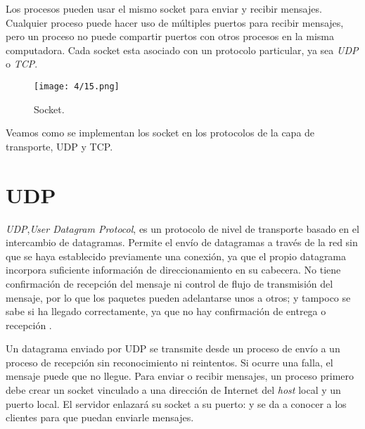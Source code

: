 Los \gls{procesos} pueden usar el mismo socket para enviar y recibir mensajes.   
Cualquier proceso puede hacer uso de múltiples puertos para recibir mensajes, pero un proceso no puede compartir puertos con otros procesos en la misma computadora. 
Cada socket esta asociado con un protocolo particular, ya sea \textit{UDP} o \textit{TCP}.


\begin{figure}  
	 \begin{center}%
	\texttt{[image: 4/15.png]}
	\caption{Socket.}
	\label{fig:socket}
\end{center} 
 \end{figure}

Veamos como se implementan los socket en los protocolos de la capa de transporte, UDP y TCP.

\section{UDP}
\textit{UDP},\textit{User Datagram Protocol}, es un protocolo de nivel de transporte basado en el intercambio de datagramas. Permite el envío de datagramas a través de la red sin que se haya establecido previamente una conexión, ya que el propio datagrama incorpora suficiente información de direccionamiento en su cabecera. No tiene confirmación de recepción del mensaje ni control de flujo de transmisión del mensaje, por lo que los paquetes pueden adelantarse unos a otros; y tampoco se sabe si ha llegado correctamente, ya que no hay confirmación de entrega o recepción .

Un datagrama enviado por UDP se transmite desde un proceso de envío a un proceso de recepción sin reconocimiento ni reintentos. Si ocurre una falla, el mensaje puede que no llegue.   Para enviar o recibir mensajes, un proceso primero debe crear un socket vinculado a una dirección de Internet del \textit{host} local y un puerto local. El  servidor enlazará su socket a su puerto: y se da a conocer a los clientes para que puedan enviarle mensajes. 
  
 

